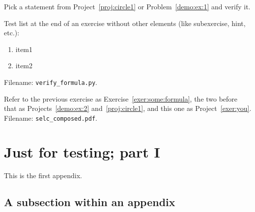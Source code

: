 \n\documentclass[%
oneside,                 %
final,                   %
10pt]{article}
\newenvironment{doconceexercise}{}{}
\newcounter{doconceexercisecounter}
\theoremstyle{definition}
\begin{document}
\begin{enumerate}
\begin{doconceexercise}

                             
\label{exer:some:formula}

Pick a statement from Project~\vref{proj:circle1} or Problem~\vref{demo:ex:1}
and verify it.

Test list at the end of an exercise without other elements (like subexercise,
hint, etc.):

\begin{enumerate}
\item item1

\item item2
\end{enumerate}

\noindent
\noindent Filename: \Verb!verify_formula.py!.

\end{doconceexercise}

\begin{doconceexercise}

                             
\label{exer:you}

Refer to the previous exercise as Exercise~\vref{exer:some:formula},
the two before that as Projects~\vref{demo:ex:2} and~\vref{proj:circle1},
and this one as Project~\vref{exer:you}.
\noindent Filename: \Verb!selc_composed.pdf!.

\end{doconceexercise}






\appendix

\section{Just for testing; part I}
\label{app1}

This is the first appendix.

\subsection{A subsection within an appendix}


\end{enumerate}
\end{document}
